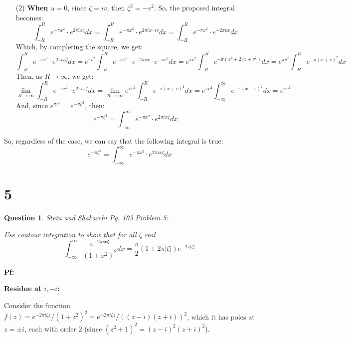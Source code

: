 \documentclass{article}
\newtheorem{question}{Question}
\begin{document}
\begin{itemize}
    \item[(2)] \textbf{When $u=0$}, since $\zeta=iv$, then $\zeta^2 = -v^2$. So, the proposed integral becomes:
    $$\int_{-R}^{R}e^{-\pi x^2}\cdot e^{2\pi ix\zeta}dx = \int_{-R}^{R}e^{-\pi x^2}\cdot e^{2\pi ix\cdot iv}dx = \int_{-R}^{R}e^{-\pi x^2}\cdot e^{-2\pi vx}dx$$
    Which, by completing the square, we get:
    $$\int_{-R}^{R}e^{-\pi x^2}\cdot e^{2\pi ix\zeta}dx = e^{\pi v^2}\int_{-R}^{R}e^{-\pi x^2}\cdot e^{-2\pi vx}\cdot e^{-\pi v^2}dx = e^{\pi v^2}\int_{-R}^{R}e^{-\pi(x^2+2vx+v^2)}dx = e^{\pi v^2}\int_{-R}^{R}e^{-\pi(x+v)^2}dx$$
    Then, as $R\rightarrow\infty$, we get:
    $$\lim_{R\rightarrow\infty}\int_{-R}^{R}e^{-\pi x^2}\cdot e^{2\pi ix\zeta}dx=\lim_{R\rightarrow\infty}e^{\pi v^2}\int_{-R}^{R}e^{-\pi(x+v)^2}dx = e^{\pi v^2}\int_{-\infty}^{\infty}e^{-\pi(x+v)^2}dx = e^{\pi v^2}$$
    And, since $e^{\pi v^2}=e^{-\pi \zeta^2}$, then:
    $$e^{-\pi \zeta^2} = \int_{-\infty}^{\infty}e^{-\pi x^2}\cdot e^{2\pi ix\zeta}dx$$
\end{itemize}

\hfil

So, regardless of the case, we can say that the following integral is true:
$$e^{-\pi \zeta^2} = \int_{-\infty}^{\infty}e^{-\pi x^2}\cdot e^{2\pi ix\zeta}dx$$

\hfil

\hfil

\section*{5}
\begin{myBox}[]{}
    \begin{question}
        Stein and Shakarchi Pg. 103 Problem 5:

        Use contour integration to show that for all $\zeta$ real
        $$\int_{-\infty}^{\infty}\frac{e^{-2\pi ix\zeta}}{(1+x^2)^2}dx = \frac{\pi}{2}(1+2\pi |\zeta|)e^{-2\pi |\zeta|}$$
    \end{question}
\end{myBox}

\textbf{Pf:}

\textbf{Residue at $i,-i$:}

Consider the function $f(z)=e^{-2\pi i\zeta z}/(1+z^2)^2 = e^{-2\pi i\zeta z}/((z-i)(z+i))^2$, which it has poles at $z=\pm i$, each with order $2$ (since $(z^2+1)^2=(z-i)^2(z+i)^2$).
\end{document}
